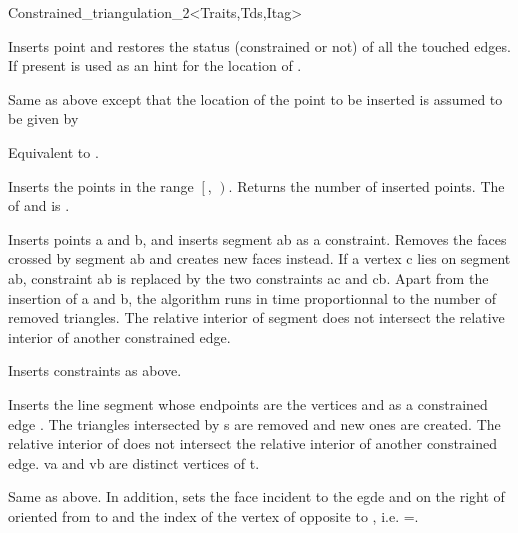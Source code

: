 \begin{ccRefClass}{Constrained_triangulation_2<Traits,Tds,Itag>}

{ Inserts point  and restores the status (constrained or not) of all
the touched edges. If present  is used as an hint
for the location of .}

{Same as above except that the location of the point
  to be inserted is assumed to be given by
}

{Equivalent to .}

{Inserts the points in the range
 $\left[\right.$, $\left.\right)$.
 Returns the number of inserted points.
 \ccPrecond The  of  and 
 is .}

{ Inserts points a and b, and inserts segment ab as a
constraint. Removes the faces crossed by segment ab and creates new
faces instead. If a vertex c lies on segment ab, constraint ab is
replaced by the two constraints ac and cb. Apart from the insertion of
a and b, the algorithm runs in time proportionnal to the number of
removed triangles. 
\ccPrecond The relative interior of segment  does not
intersect the relative interior of another constrained edge.}

{Inserts constraints  as above.}

{ Inserts the line segment  whose endpoints are the vertices 
 and
  as a constrained edge . The triangles intersected by s
are removed and new ones are created. 
\ccPrecond The relative interior of  does not
intersect the relative interior of another constrained edge.  
\ccPrecond  va and vb are distinct vertices of t.  }

{Same as above. In addition,  sets the face  incident to the
egde  
and on the right of  oriented from   to 
and the index   of the vertex of  opposite to
, i.e.  =.}	    


\end{ccRefClass}
